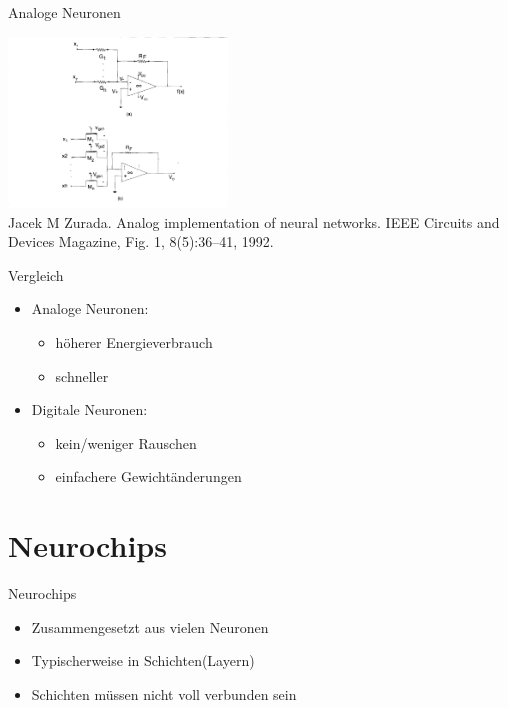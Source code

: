 \documentclass[handout]{beamer}
\begin{document}
    \begin{frame} {Analoge Neuronen}
        \begin{center}
            \includegraphics[width=220px]{../resources/analog-weights.png} \\
            \tiny Jacek M Zurada. Analog implementation of neural networks. IEEE
            Circuits and Devices Magazine, Fig. 1, 8(5):36–41, 1992.
        \end{center}
    \end{frame}

    \begin{frame} {Vergleich}
        \begin{itemize}
            \item Analoge Neuronen:
            \begin{itemize}
                \item höherer Energieverbrauch
                \item schneller
            \end{itemize}
            \item Digitale Neuronen:
            \begin{itemize}
                \item kein/weniger Rauschen
                \item einfachere Gewichtänderungen
            \end{itemize}
        \end{itemize}
    \end{frame}

    \section{Neurochips}

    \begin{frame} {Neurochips}
        \begin{itemize}
            \item Zusammengesetzt aus vielen Neuronen
            \item Typischerweise in Schichten(Layern)
            \item Schichten müssen nicht voll verbunden sein
        \end{itemize}
    \end{frame}
\end{document}
